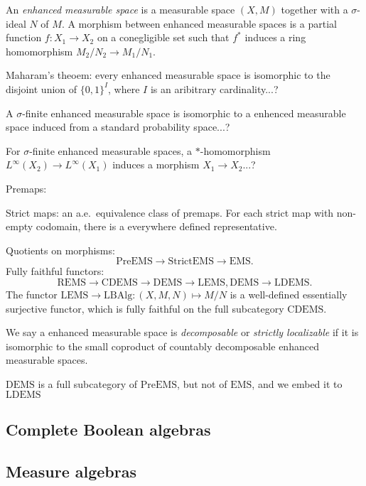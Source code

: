 \documentclass{../../large}
\begin{document}
\begin{prb}
An \emph{enhanced measurable space} is a measurable space $(X,M)$ together with a $\sigma$-ideal $N$ of $M$.
A morphism between enhanced measurable spaces is a partial function $f:X_1\to X_2$ on a conegligible set such that $f^*$ induces a ring homomorphism $M_2/N_2\to M_1/N_1$.
\begin{parts}
\item Maharam's theoem: every enhanced measurable space is isomorphic to the disjoint union of $\{0,1\}^I$, where $I$ is an aribitrary cardinality...?
\item A $\sigma$-finite enhanced measurable space is isomorphic to a enhenced measurable space induced from a standard probability space...?
\item For $\sigma$-finite enhanced measurable spaces, a $*$-homomorphism $L^\infty(X_2)\to L^\infty(X_1)$ induces a morphism $X_1\to X_2$...?
\end{parts}
\end{prb}


Premaps: 

Strict maps: an a.e.~equivalence class of premaps. For each strict map with non-empty codomain, there is a everywhere defined representative.


Quotients on morphisms:
\[\mathrm{PreEMS}\to\mathrm{StrictEMS}\to\mathrm{EMS}.\]
Fully faithful functors:
\[\mathrm{REMS}\to\mathrm{CDEMS}\to\mathrm{DEMS}\to\mathrm{LEMS}, \mathrm{DEMS}\to\mathrm{LDEMS}.\]
The functor $\mathrm{LEMS}\to\mathrm{LBAlg}:(X,M,N)\mapsto M/N$ is a well-defined essentially surjective functor, which is fully faithful on the full subcategory $\mathrm{CDEMS}$.

We say a enhanced measurable space is \emph{decomposable} or \emph{strictly localizable} if it is isomorphic to the small coproduct of countably decomposable enhanced measurable spaces.

$\mathrm{DEMS}$ is a full subcategory of $\mathrm{PreEMS}$, but not of $\mathrm{EMS}$, and we embed it to $\mathrm{LDEMS}$




\subsection{Complete Boolean algebras}





\subsection{Measure algebras}
\end{document}
